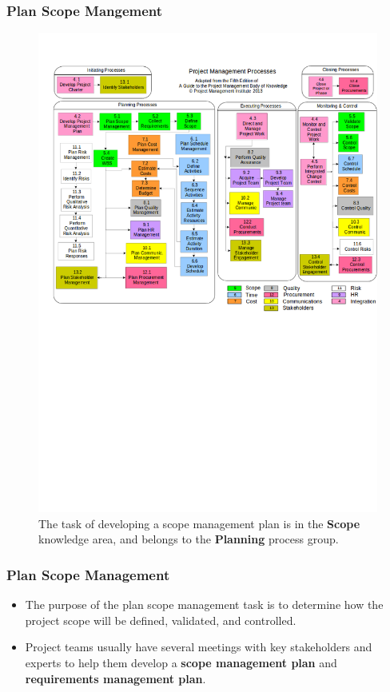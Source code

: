 \documentclass{beamer}
\begin{document}
\begin{frame}
\frametitle{Plan Scope Mangement}
\begin{figure}
\caption{The task of developing a scope management plan is in the \textbf{Scope} knowledge area, and belongs to the \textbf{Planning} process group.}
\vspace{-0.8cm}
\includegraphics[scale=0.3]{mapping}
\end{figure}
\end{frame}


\begin{frame}
\frametitle{Plan Scope Management}
\begin{itemize}
\item The purpose of the plan scope management task is to determine how the project scope will be defined, validated, and controlled.
\vspace{0.5cm}
\item Project teams usually have several meetings with key stakeholders and experts to help them develop a \textbf{scope management plan} and \textbf{requirements management plan}.
\end{itemize}
\end{frame}
\end{document}

